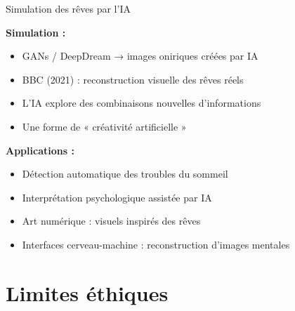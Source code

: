 \documentclass[aspectratio=169]{beamer}
\begin{document}
\begin{frame}{Simulation des rêves par l'IA} \label{applications}\label{simulation}

\textbf{Simulation :}

\begin{itemize}
  \item GANs / DeepDream → images oniriques créées par IA
  \item BBC (2021) : reconstruction visuelle des rêves réels
  \item L'IA explore des combinaisons nouvelles d'informations
  \item Une forme de « créativité artificielle »
\end{itemize}

\vspace{0.5cm}

\textbf{Applications :}

\begin{itemize}
  \item    Détection automatique des troubles du sommeil
  \item    Interprétation psychologique assistée par IA
  \item    Art numérique : visuels inspirés des rêves
  \item    Interfaces cerveau-machine : reconstruction d'images mentales
\end{itemize}

\end{frame}


\section{Limites éthiques}
\end{document}
